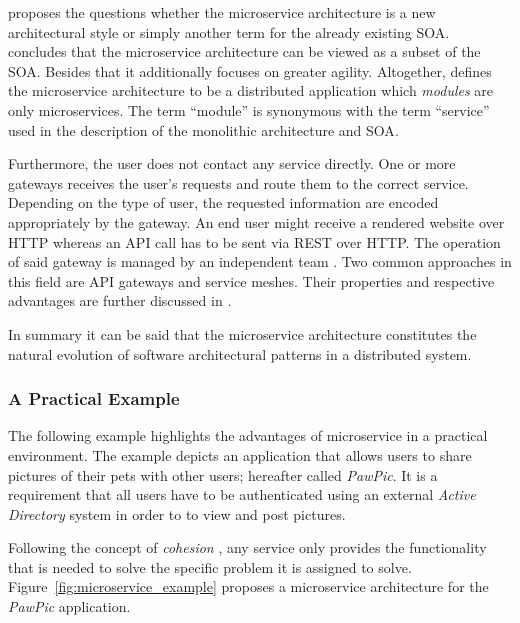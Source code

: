 \autocite{VillamizarEvaluatingmonolithicmicroservice2015} proposes the
questions whether the microservice architecture is a new architectural style or
simply another term for the already existing \ac{SOA}.
\autocite{VillamizarEvaluatingmonolithicmicroservice2015} concludes that the
microservice architecture can be viewed as a subset of the \ac{SOA}. Besides
that it additionally focuses on greater agility. Altogether,
\autocite{DragoniMicroservicesyesterdaytoday2016} defines the microservice
architecture to be a distributed application which \textit{modules} are only
microservices. The term \enquote{module} is synonymous with the term
\enquote{service} used in the description of the monolithic architecture and
\ac{SOA}.

Furthermore, the user does not contact any service directly. One or more
gateways receives the user's requests and route them to the correct service.
Depending on the type of user, the requested information are encoded
appropriately by the gateway. An end user might receive a rendered website over
\ac{HTTP} whereas an \ac{API} call has to be sent via \ac{REST} over \ac{HTTP}.
The operation of said gateway is managed by an independent team \autocite[p.
585]{VillamizarEvaluatingmonolithicmicroservice2015}. Two common approaches in
this field are \ac{API} gateways and service meshes. Their properties and
respective advantages are further discussed in
\autocite{HariharaSubramanianHandsRESTfulAPI2019}.

In summary it can be said that the microservice architecture constitutes the
natural evolution of software architectural patterns in a distributed system.

\subsubsection{A Practical Example}%
\label{ssub:A_Practical_Example}

The following example highlights the advantages of microservice in a practical
environment. The example depicts an application that allows users to share
pictures of their pets with other users; hereafter called \textit{PawPic}.
It is a requirement that all users have to be authenticated using an external
\textit{Active Directory} system in order to to view and post pictures.

Following the concept of \textit{cohesion} \autocite[p.
2]{DragoniMicroservicesyesterdaytoday2016}, any service only provides the
functionality that is needed to solve the specific problem it is assigned to
solve. Figure~\ref{fig:microservice_example} proposes a microservice
architecture for the \textit{PawPic} application.

